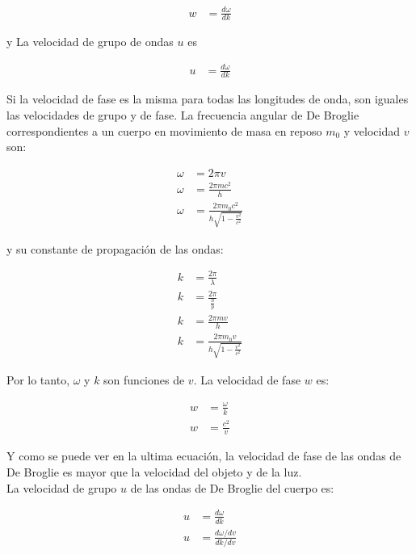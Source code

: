 \documentclass[a4paper]{article}
\begin{document}
    \begin{align}
        w &= \frac{d\omega}{dk} \tag*{Velocidad de fase}
    \end{align}

    \indent y La velocidad de grupo de ondas \( u \) es

    \begin{align}
        u &= \frac{d\omega}{dk} \tag*{Velocidad de grupo}
    \end{align}

    \indent Si la velocidad de fase es la misma para todas las longitudes de onda, son iguales las velocidades de grupo y de fase. La frecuencia angular de De Broglie correspondientes a un cuerpo en movimiento de masa en reposo $m_0$ y velocidad $v$ son:

    \begin{align}
        \omega &= 2\pi v \tag*{} \\[10pt]
        \omega &= \frac{2 \pi mc^2}{h} \tag*{} \\[10pt]
        \omega &= \frac{2 \pi m_0 c^2}{h\sqrt{1-\frac{v^2}{c^2}}} \tag*{} 
    \end{align}

    \indent y su constante de propagación de las ondas:

    \begin{align}
        k &= \frac{2 \pi}{\lambda} \tag*{} \\[10pt]
        k &= \frac{2 \pi}{\frac{h}{p}} \tag*{} \\[10pt]
        k &= \frac{2 \pi mv}{h} \tag*{} \\[10pt]
        k &= \frac{2 \pi m_0 v}{h\sqrt{1-\frac{v^2}{c^2}}} \tag*{}
    \end{align}

    \indent Por lo tanto, $\omega$ y $k$ son funciones de $v$. La velocidad de fase $w$ es:

    \begin{align}
        w &= \frac{\omega}{k} \tag*{} \\[10pt]
        w &= \frac{c^2}{v} \tag*{}
    \end{align}

    \indent Y como se puede ver en la ultima ecuación, la velocidad de fase de las ondas de De Broglie es mayor que la velocidad del objeto y de la luz.\\
    \indent La velocidad de grupo $u$ de las ondas de De Broglie del cuerpo es: 

    \begin{align}
        u &= \frac{d\omega}{dk} \tag*{} \\[10pt]
        u &= \frac{d\omega/dv}{dk/dv} \tag*{} 
    \end{align}
\end{document}
